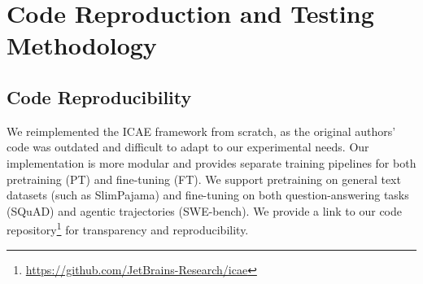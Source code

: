 \section{Code Reproduction and Testing Methodology}

\subsection{Code Reproducibility}
We reimplemented the ICAE framework from scratch, as the original authors' code was outdated and difficult to adapt to our experimental needs.
Our implementation is more modular and provides separate training pipelines for both pretraining (PT) and fine-tuning (FT).
We support pretraining on general text datasets (such as SlimPajama) and fine-tuning on both question-answering tasks (SQuAD) and agentic trajectories (SWE-bench).
We provide a link to our code repository\footnote{\url{https://github.com/JetBrains-Research/icae}} for transparency and reproducibility.


